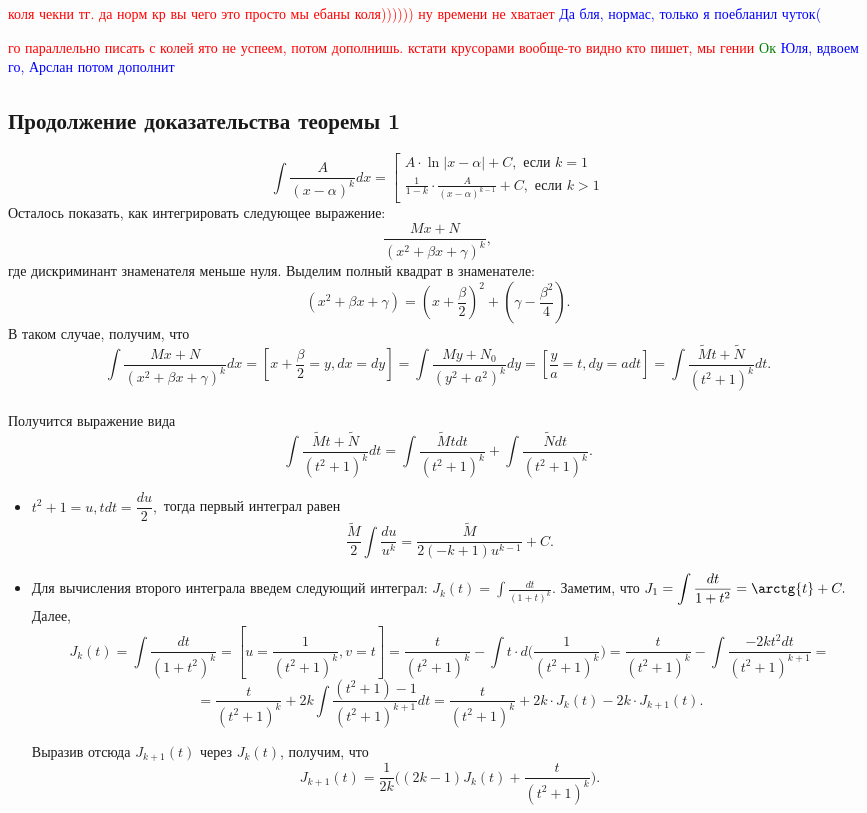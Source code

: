 \documentclass{article}
\theoremstyle{plain}
\theoremstyle{definition}
\theoremstyle{remark}
\begin{document}
\textcolor{red}{коля чекни тг. да норм кр вы чего это просто мы ебаны коля)))))) ну времени не хватает}
\textcolor{blue}{Да бля, нормас, только я поебланил чуток(}



\textcolor{red}{го параллельно писать с колей
ято не успеем, потом дополнишь. кстати крусорами вообще-то видно кто пишет, мы гении}
\textcolor{green}{Ок}
\textcolor{blue}{Юля, вдвоем го, Арслан потом дополнит}



\subsection{Продолжение доказательства теоремы 1}
$$\int \frac{A}{(x-\alpha)^{k}}dx = 
\left[
\begin{aligned}
A\cdot \ln{|x-\alpha|} + C, \text{ если } k = 1\\
\frac{1}{1-k}\cdot \frac{A}{(x-\alpha)^{k-1}} + C, \text{ если } k > 1
\end{aligned}
\right.
$$
Осталось показать, как интегрировать следующее выражение:
 \[
\frac{Mx + N}{(x^2 + \beta x + \gamma)^k},\] где дискриминант знаменателя меньше нуля. Выделим полный квадрат в знаменателе: \[(x^2 + \beta x + \gamma) = \left(x + \frac{\beta}{2}\right)^2 + \left(\gamma - \frac{\beta^2}{4}\right).\] В таком случае, получим, что \[\int \frac{Mx + N}{(x^2 + \beta x + \gamma)^k}dx = [x + \frac{\beta}{2} = y, dx = dy] = \int \frac{My + N_0}{(y^2 + a^2)^k}dy = [\frac{y}{a} = t, dy = adt] = \int \frac{\widetilde{M}t + \widetilde{N}}{(t^2 + 1)^k}dt.\] \\
Получится выражение вида \[\int \frac{\widetilde{M}t + \widetilde{N}}{(t^2 + 1)^k}dt = \int \frac{\widetilde{M}tdt}{(t^2 + 1)^k} + \int \frac{\widetilde{N}dt}{(t^2 + 1)^k}.\]
\begin{itemize}
    \item $t^2 + 1 = u, tdt = \dfrac{du}{2},$ тогда первый интеграл равен $$\frac{\widetilde{M}}{2}\int \frac{du}{u^k} = \frac{\widetilde{M}}{2(-k+1)u^{k-1}} + C.$$
    \item Для вычисления второго интеграла введем следующий интеграл: $\displaystyle J_k(t) = \int \frac{dt}{(1+t)^k}.$ Заметим, что $\displaystyle J_1 = \int \frac{dt}{1 + t^2} = \arctg{t} + C.$ Далее, \[J_k(t) = \int \frac{dt}{(1 + t^2)^k} = [u = \frac{1}{(t^2 + 1)^k}, v = t] = \frac{t}{(t^2 + 1)^k} - \int t \cdot d\Big(\frac{1}{(t^2 + 1)^k}\Big) = \frac{t}{(t^2 + 1)^k} - \int \frac{-2kt^2dt}{(t^2 + 1)^{k+1}} =\]\[= \frac{t}{(t^2 + 1)^k} + 2k \int \frac{(t^2 + 1) - 1}{(t^2 + 1)^{k+1}}dt = \frac{t}{(t^2 + 1)^k} + 2k \cdot J_k(t) - 2k \cdot J_{k+1}(t).\]
    
    Выразив отсюда $J_{k+1}(t)$ через $J_{k}(t)$, получим, что \[J_{k+1}(t) = \frac{1}{2k}\Big((2k - 1)J_k(t) + \frac{t}{(t^2 + 1)^k}\Big).\] 
\end{itemize}
\end{document}
